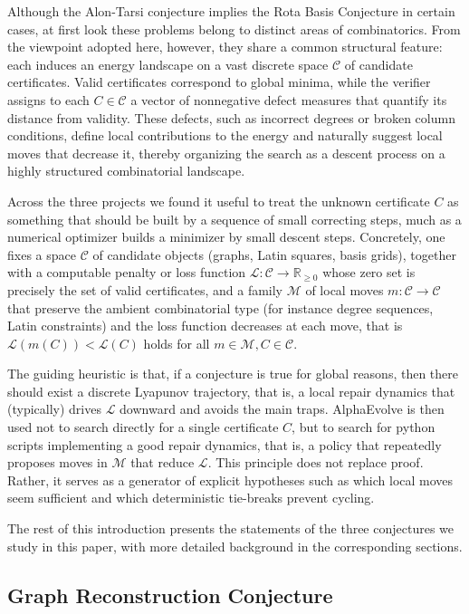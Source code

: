 \documentclass[11pt]{amsart}
\begin{document}
Although the Alon-Tarsi conjecture implies the Rota Basis Conjecture in certain cases, at first look these problems belong to distinct areas of combinatorics.  From the viewpoint adopted here, however, they share a common structural feature: each induces an energy landscape on a vast discrete space $\mathcal{C}$ of candidate certificates. Valid certificates correspond to global minima, while the verifier assigns to each $C \in \mathcal{C}$
a vector of nonnegative defect measures that quantify its distance from validity. These defects, such as incorrect degrees or broken column conditions, define local contributions to the energy and naturally suggest local moves that decrease it, thereby organizing the search as a descent process on a highly structured combinatorial landscape.

Across the three projects we found it useful to treat the unknown certificate $C$ as something that should be built by a sequence of small correcting steps,
much as a numerical optimizer builds a minimizer by small descent steps.
Concretely, one fixes a space $\mathcal{C}$ of candidate objects (graphs, Latin squares, basis grids), together with a computable penalty or loss function $\mathcal{L}:\mathcal{C}\to \mathbb{R}_{\ge 0}$ whose zero set is precisely the set of valid certificates, and a family $\mathcal{M}$ of local moves $m:\mathcal{C}\to\mathcal{C}$ that preserve the ambient combinatorial type (for instance degree sequences, Latin constraints) and the loss function decreases at each move, that is $\mathcal{L}(m(C))<\mathcal{L}(C)$ holds for all $m\in \mathcal{M}, C\in \mathcal{C}$. 

The guiding heuristic is that, if a conjecture is true for global reasons, then there should exist a discrete Lyapunov trajectory, that is, 
a local repair dynamics that (typically) drives $\mathcal{L}$ downward and avoids the main traps.
AlphaEvolve is then used not to search directly for a single certificate $C$,
but to search for python scripts implementing a good repair dynamics, that is, a policy that repeatedly proposes moves in $\mathcal{M}$
that reduce $\mathcal{L}$.
This principle does not replace proof. Rather, it serves as a generator of explicit hypotheses such as which local moves seem sufficient and which deterministic tie-breaks prevent cycling.

The rest of this introduction presents the statements of the three conjectures we study in this paper, with more detailed background in the corresponding sections. 

\subsection{Graph Reconstruction Conjecture}
\label{sec:intro-graph}
\end{document}
